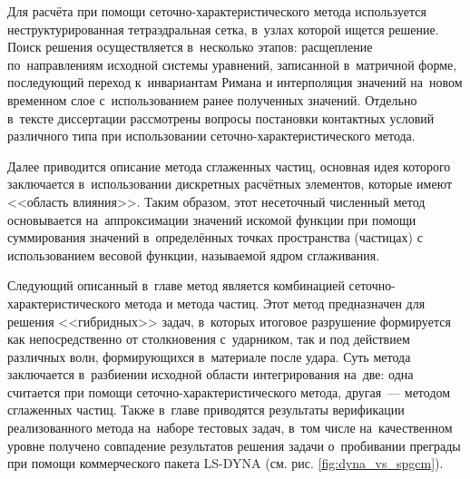 \documentclass[a4paper,14pt]{extarticle}
\numberwithin{equation}{section}
\begin{document}
        Для расчёта при помощи сеточно-характеристического метода используется неструктурированная тетраэдральная сетка,
        в~узлах которой ищется решение. Поиск решения осуществляется в~несколько этапов: расщепление по~направлениям
        исходной системы уравнений, записанной в~матричной форме, последующий переход к~инвариантам Римана и
        интерполяция значений на~новом временном слое с~использованием ранее полученных значений. Отдельно в~тексте
        диссертации рассмотрены вопросы постановки контактных условий различного типа при
        использовании сеточно-характеристического метода.

        Далее приводится описание метода сглаженных частиц, основная идея которого заключается в~использовании
        дискретных расчётных элементов, которые имеют <<область влияния>>. Таким образом, этот несеточный численный метод
        основывается на~аппроксимации значений искомой функции при помощи суммирования значений в~определённых точках
        пространства (частицах) с использованием весовой функции, называемой ядром сглаживания.

        Следующий описанный в~главе метод является комбинацией сеточно-характеристического метода и метода частиц. Этот метод
        предназначен для решения <<гибридных>> задач, в~которых итоговое разрушение формируется как непосредственно от
        столкновения с~ударником, так и под действием различных волн, формирующихся в~материале после удара. Суть метода
        заключается в~разбиении исходной области интегрирования на~две: одна считается при помощи
        сеточно-характеристического метода, другая~--- методом сглаженных частиц. Также в~главе приводятся результаты
        верификации реализованного метода на~наборе тестовых задач, в~том числе на~качественном уровне получено
        совпадение результатов решения задачи о~пробивании преграды при помощи коммерческого пакета LS-DYNA (см. рис.
        \ref{fig:dyna_vs_spgcm}).
\end{document}
